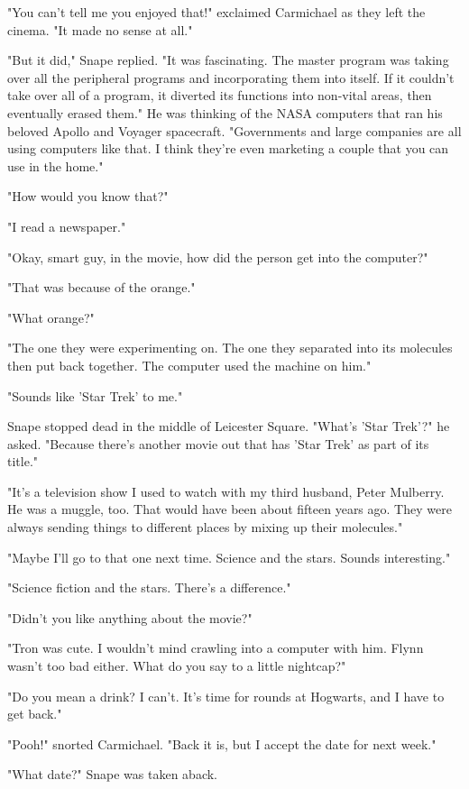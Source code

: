 \documentclass[a4paper,11pt]{article}
\begin{document}
"You can't tell me you enjoyed that!" exclaimed Carmichael as they left the cinema. "It made no sense at all."

"But it did," Snape replied. "It was fascinating. The master program was taking over all the peripheral programs and incorporating them into itself. If it couldn't take over all of a program, it diverted its functions into non-vital areas, then eventually erased them." He was thinking of the NASA computers that ran his beloved Apollo and Voyager spacecraft. "Governments and large companies are all using computers like that. I think they're even marketing a couple that you can use in the home."

"How would you know that?"

"I read a newspaper."

"Okay, smart guy, in the movie, how did the person get into the computer?"

"That was because of the orange."

"What orange?"

"The one they were experimenting on. The one they separated into its molecules then put back together. The computer used the machine on him."

"Sounds like 'Star Trek' to me."

Snape stopped dead in the middle of Leicester Square. "What's 'Star Trek'?" he asked. "Because there's another movie out that has 'Star Trek' as part of its title."

"It's a television show I used to watch with my third husband, Peter Mulberry. He was a muggle, too. That would have been about fifteen years ago. They were always sending things to different places by mixing up their molecules."

"Maybe I'll go to that one next time. Science and the stars. Sounds interesting."

"Science fiction and the stars. There's a difference."

"Didn't you like anything about the movie?"

"Tron was cute. I wouldn't mind crawling into a computer with him. Flynn wasn't too bad either. What do you say to a little nightcap?"

"Do you mean a drink? I can't. It's time for rounds at Hogwarts, and I have to get back."

"Pooh!" snorted Carmichael. "Back it is, but I accept the date for next week."

"What date?" Snape was taken aback.
\end{document}
